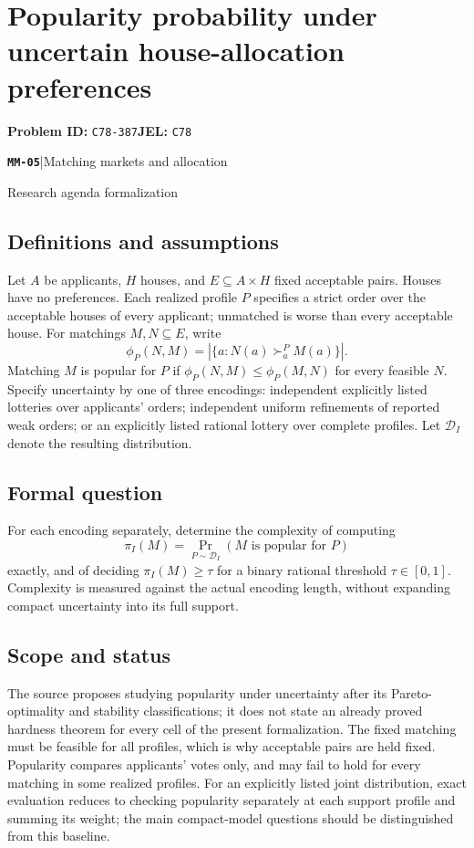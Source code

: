 \documentclass[11pt,a4paper]{article}
\newcommand{\entrymeta}[3]{{\sffamily\small\color{muted}\textbf{\texttt{#1}}\quad|\quad #2\par #3\par}}
\begin{document}
\section*{Popularity probability under uncertain house-allocation preferences}
\textbf{Problem ID:} \texttt{C78-387}\quad \textbf{JEL:} \texttt{C78}\par
\label{problem:OP-0546}
\label{beyond:MM-05}
\entrymeta{MM-05}{Matching markets and allocation}{Research agenda formalization}
\subsection*{Definitions and assumptions}
Let $A$ be applicants, $H$ houses, and $E\subseteq A\times H$ fixed acceptable pairs. Houses have no preferences. Each realized profile $P$ specifies a strict order over the acceptable houses of every applicant; unmatched is worse than every acceptable house. For matchings $M,N\subseteq E$, write
\[
 \phi_P(N,M)=|\{a:N(a)\succ_a^P M(a)\}|.
\]
Matching $M$ is popular for $P$ if $\phi_P(N,M)\le\phi_P(M,N)$ for every feasible $N$. Specify uncertainty by one of three encodings: independent explicitly listed lotteries over applicants' orders; independent uniform refinements of reported weak orders; or an explicitly listed rational lottery over complete profiles. Let $\mathcal D_I$ denote the resulting distribution.
\subsection*{Formal question}
For each encoding separately, determine the complexity of computing
\[
 \pi_I(M)=\Pr_{P\sim\mathcal D_I}(M\text{ is popular for }P)
\]
exactly, and of deciding $\pi_I(M)\ge\tau$ for a binary rational threshold $\tau\in[0,1]$. Complexity is measured against the actual encoding length, without expanding compact uncertainty into its full support.
\subsection*{Scope and status}
The source proposes studying popularity under uncertainty after its Pareto-optimality and stability classifications; it does not state an already proved hardness theorem for every cell of the present formalization. The fixed matching must be feasible for all profiles, which is why acceptable pairs are held fixed. Popularity compares applicants' votes only, and may fail to hold for every matching in some realized profiles. For an explicitly listed joint distribution, exact evaluation reduces to checking popularity separately at each support profile and summing its weight; the main compact-model questions should be distinguished from this baseline.
\end{document}
